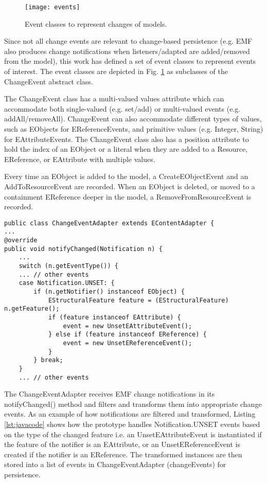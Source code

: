 \begin{figure}[th]
    \centering
    \texttt{[image: events]}
    \caption{Event classes to represent changes of models.}
    \label{fig:events}
\end{figure}

Since not all change events are relevant to change-based persistence (e.g. EMF also produces change notifications when listeners/adapted are added/removed from the model), this work has defined a set of event classes to represent events of interest. The event classes are depicted in Fig. \ref{fig:events} as subclasses of the \textsf{ChangeEvent} abstract class.

The \textsf{ChangeEvent} class has a multi-valued \textsf{values} attribute which can accommodate both single-valued (e.g. set/add) or multi-valued events (e.g. addAll/removeAll). \textsf{ChangeEvent} can also accommodate different types of values, such as \textsf{EObject}s for \textsf{EReferenceEvents}, and primitive values (e.g. Integer, String) for \textsf{EAttributeEvents}. The \textsf{ChangeEvent} class also has a position attribute to hold the  index of an \textsf{EObject} or a literal when they are added to a \textsf{Resource}, \textsf{EReference}, or \textsf{EAttribute} with multiple values. 

Every time an \textsf{EObject} is added to the model, a \textsf{CreateEObjectEvent} and an \textsf{AddToResourceEvent} are recorded. When an EObject is deleted, or moved to a containment \textsf{EReference} deeper in the model, a \textsf{RemoveFromResourceEvent}
 is recorded.

\vspace{-20pt}
\begin{lstlisting}[style=java,caption={Simplified Java code to handle notification events.},label=lst:javacode]
public class ChangeEventAdapter extends EContentAdapter {
...
@override
public void notifyChanged(Notification n) {
    ...
    switch (n.getEventType()) {
    ... // other events
    case Notification.UNSET: {
        if (n.getNotifier() instanceof EObject) {
            EStructuralFeature feature = (EStructuralFeature) n.getFeature();
            if (feature instanceof EAttribute) {
                event = new UnsetEAttributeEvent();
            } else if (feature instanceof EReference) {
                event = new UnsetEReferenceEvent();
            }
        } break;
    } 
    ... // other events
\end{lstlisting}	

The \textsf{ChangeEventAdapter} receives EMF change notifications in its \textsf{notifyChanged()} method and filters and transforms them into appropriate change events. As an example of how notifications are filtered and transformed, Listing \ref{lst:javacode} shows how the prototype handles \textsf{Notification.UNSET} events based on the type of the changed feature i.e. an \textsf{UnsetEAttributeEvent} is instantiated if the feature of the notifier is an \textsf{EAttribute}, or an \textsf{UnsetEReferenceEvent}  is created if the notifier is an \textsf{EReference}. The transformed instances are then stored into a list of events in \textsf{ChangeEventAdapter} (\textsf{changeEvents}) for persistence. 

